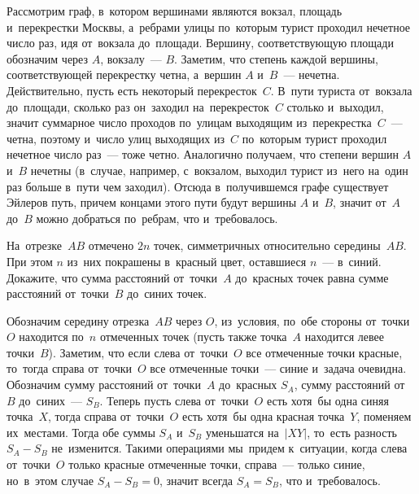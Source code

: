 \ifincludesolutions
Рассмотрим граф, в~котором вершинами являются вокзал, площадь
и~перекрестки Москвы, а~ребрами улицы по~которым турист проходил нечетное число
раз, идя от~вокзала до~площади.
Вершину, соответствующую площади обозначим через $A$, вокзалу~--- $B$.
Заметим, что степень каждой вершины, соответствующей перекрестку четна,
а~вершин $A$ и~$B$~--- нечетна.
Действительно, пусть есть некоторый перекресток~$C$.
В~пути туриста от~вокзала до~площади, сколько раз он~заходил на~перекресток~$C$
столько и~выходил, значит суммарное число проходов по~улицам выходящим
из~перекрестка~$C$~--- четна, поэтому и~число улиц выходящих из~$C$ по~которым
турист проходил нечетное число раз~--- тоже четно.
Аналогично получаем, что степени вершин $A$ и~$B$ нечетны (в~случае, например,
с~вокзалом, выходил турист из~него на~один раз больше в~пути чем заходил).
Отсюда в~получившемся графе существует Эйлеров путь, причем концами этого пути
будут вершины $A$ и~$B$, значит от~$A$ до~$B$ можно добраться по~ребрам, что
и~требовалось.
\fi %

\begin{problems}

\item
На~отрезке~$AB$ отмечено $2 n$ точек, симметричных относительно середины~$AB$.
При этом $n$ из~них покрашены в~красный цвет, оставшиеся $n$~--- в~синий.
Докажите, что сумма расстояний от~точки~$A$ до~красных точек равна сумме
расстояний от~точки~$B$ до~синих точек.

\end{problems}

\ifincludesolutions
Обозначим середину отрезка~$AB$ через $O$, из~условия, по~обе
стороны от~точки~$O$ находится по~$n$ отмеченных точек (пусть также точка~$A$
находится левее точки~$B$).
Заметим, что если слева от~точки~$O$ все отмеченные точки красные, то~тогда
справа от~точки~$O$ все отмеченные точки~--- синие и~задача очевидна.
Обозначим сумму расстояний от~точки~$A$ до~красных $S_A$, сумму расстояний
от~$B$ до~синих~--- $S_B$.
Теперь пусть слева от~точки~$O$ есть хотя~бы одна синяя точка~$X$, тогда справа
от~точки~$O$ есть хотя~бы одна красная точка~$Y$, поменяем их~местами.
Тогда обе суммы $S_A$ и~$S_B$ уменьшатся на~$\lvert XY \rvert$, то~есть разность
$S_A - S_B$ не~изменится.
Такими операциями мы~придем к~ситуации, когда слева от~точки~$O$ только красные
отмеченные точки, справа~--- только синие, но~в~этом случае $S_A - S_B = 0$,
значит всегда $S_A = S_B$, что и~требовалось.
\fi %

